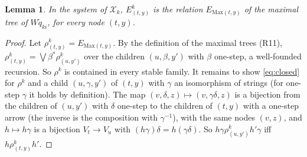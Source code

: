 \documentclass[11pt]{amsart}
\newtheorem{lem}[thm]{Lemma}
\theoremstyle{definition}
\newcommand{\Max}{\mathrm{Max}}
\newcommand{\cX}{\mathcal X}
\begin{document}
\begin{lem}\label{lem:rho}
In the system of $\cX_k$, $E^k_{(t,y)}$ is the relation
$E_{\Max(t,y)}$ of the maximal tree of $W\tilde q_{ki}$, for every
node $(t,y)$.
\end{lem}
\begin{proof}
Let $\rho^k_{(t,y)}=E_{\Max(t,y)}$. By the definition of the maximal
trees (R11), $\rho^k_{(t,y)}=\bigvee\beta^*\rho^k_{(u,y')}$ over the
children $(u,\beta,y')$ with $\beta$ one-step, a well-founded
recursion. So $\rho^k$ is contained in every stable family. It remains to show \eqref{eq:closed} for $\rho^k$ and a
child $(u,\gamma,y')$ of $(t,y)$ with $\gamma$ an isomorphism of
strings (for one-step $\gamma$ it holds by definition). The map
$(v,\delta,z)\mapsto(v,\gamma\delta,z)$ is a bijection from the
children of $(u,y')$ with $\delta$ one-step to the children of $(t,y)$
with a one-step arrow
(the inverse is the composition with $\gamma^{-1}$), with the same
nodes $(v,z)$, and $h\mapsto h\gamma$ is a bijection $V_t\to V_u$
with $(h\gamma)\delta=h(\gamma\delta)$. So $h\gamma\mathrel{
\rho^k_{(u,y')}}h'\gamma$ iff $h\mathrel{\rho^k_{(t,y)}}h'$.
\end{proof}
\end{document}
